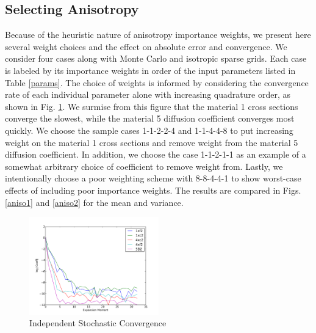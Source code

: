 \documentclass[11pt]{article}
\begin{document}
\subsection{Selecting Anisotropy}
Because of the heuristic nature of anisotropy importance weights, we present here several weight choices and the effect on absolute error and convergence.  We consider four cases along with Monte Carlo and isotropic sparse grids.  Each case is labeled by its importance weights in order of the input parameters listed in Table \ref{params}. The choice of weights is informed by considering the convergence rate of each individual parameter alone with increasing quadrature order, as shown in Fig. \ref{indconv}.  We surmise from this figure that the material 1 cross sections converge the slowest, while the material 5 diffusion coefficient converges most quickly.  We choose the sample cases 1-1-2-2-4 and 1-1-4-4-8 to put increasing weight on the material 1 cross sections and remove weight from the material 5 diffusion coefficient.  In addition, we choose the case 1-1-2-1-1 as an example of a somewhat arbitrary choice of coefficient to remove weight from.  Lastly, we intentionally choose a poor weighting scheme with 8-8-4-4-1 to show worst-case effects of including poor importance weights.  The results are compared in Figs. \ref{aniso1} and \ref{aniso2} for the mean and variance. 
\begin{figure}[H]
\centering
   \includegraphics[width=0.5\textwidth]{coefficient_decay2}
   \caption{Independent Stochastic Convergence}
   \label{indconv}
\end{figure}
\end{document}
